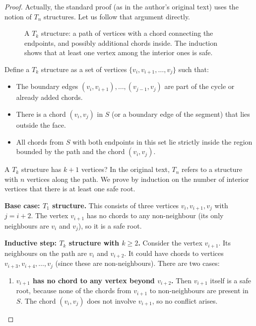 \begin{proof}
    Actually, the standard proof (as in the author’s original text) uses the notion of \(T_n\) structures. 
    Let us follow that argument directly.

    \begin{figure}[htbp]
        \centering
        \caption{A \(T_k\) structure: a path of vertices with a chord connecting the endpoints, and possibly additional chords inside. 
        The induction shows that at least one vertex among the interior ones is safe.}
        \label{fig:Tk_structure}
    \end{figure}

    Define a \(T_k\) structure as a set of vertices \(\{v_i, v_{i+1}, \dots, v_j\}\) such that:
    \begin{itemize}
        \item The boundary edges \((v_i, v_{i+1}), \dots, (v_{j-1}, v_j)\) are part of the cycle or already added chords.
        \item There is a chord \((v_i, v_j)\) in \(S\) (or a boundary edge of the segment) that lies outside the face.
        \item All chords from \(S\) with both endpoints in this set lie strictly inside the region bounded by the path and the chord \((v_i, v_j)\).
    \end{itemize}
    A \(T_k\) structure has \(k+1\) vertices? In the original text, \(T_n\) refers to a structure with \(n\) vertices along the path. 
    We prove by induction on the number of interior vertices that there is at least one safe root.

    \textbf{Base case: \(T_1\) structure.} 
    This consists of three vertices \(v_i, v_{i+1}, v_j\) with \(j = i+2\). 
    The vertex \(v_{i+1}\) has no chords to any non-neighbour (its only neighbours are \(v_i\) and \(v_j\)), so it is a safe root.

    \textbf{Inductive step: \(T_k\) structure with \(k \ge 2\).} 
    Consider the vertex \(v_{i+1}\). 
    Its neighbours on the path are \(v_i\) and \(v_{i+2}\). 
    It could have chords to vertices \(v_{i+3}, v_{i+4}, \dots, v_j\) (since these are non-neighbours). 
    There are two cases:
    \begin{enumerate}
        \item \textbf{\(v_{i+1}\) has no chord to any vertex beyond \(v_{i+2}\).} 
        Then \(v_{i+1}\) itself is a safe root, because none of the chords from \(v_{i+1}\) to non-neighbours are present in \(S\). 
        The chord \((v_i, v_j)\) does not involve \(v_{i+1}\), so no conflict arises.
        

\end{enumerate}
\end{proof}
